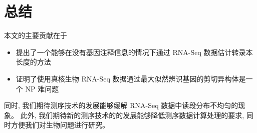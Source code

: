 \section{总结}
本文的主要贡献在于
\begin{itemize}
\item 提出了一个能够在没有基因注释信息的情况下通过 RNA-Seq 数据估计转录本长度的方法

\item 证明了使用真核生物 RNA-Seq 数据通过最大似然辨识基因的剪切异构体是一个 NP 难问题
\end{itemize}
同时, 我们期待测序技术的发展能够缓解 RNA-Seq 数据中读段分布不均匀的现象。
此外, 我们期待新的测序技术的的发展能够降低测序数据计算处理的要求, 
同时方便我们对生物问题进行研究。









